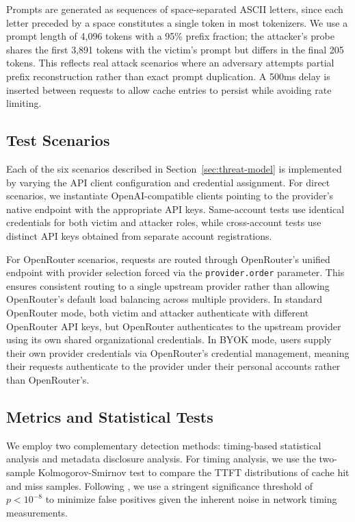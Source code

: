 \documentclass[conference]{IEEEtran}
\begin{document}
Prompts are generated as sequences of space-separated ASCII letters, since each letter preceded by a space constitutes a single token in most tokenizers.
We use a prompt length of 4,096 tokens with a 95\% prefix fraction; the attacker's probe shares the first 3,891 tokens with the victim's prompt but differs in the final 205 tokens.
This reflects real attack scenarios where an adversary attempts partial prefix reconstruction rather than exact prompt duplication.
A 500ms delay is inserted between requests to allow cache entries to persist while avoiding rate limiting.

\subsection{Test Scenarios}

Each of the six scenarios described in Section~\ref{sec:threat-model} is implemented by varying the API client configuration and credential assignment.
For direct scenarios, we instantiate OpenAI-compatible clients pointing to the provider's native endpoint with the appropriate API keys.
Same-account tests use identical credentials for both victim and attacker roles, while cross-account tests use distinct API keys obtained from separate account registrations.

For OpenRouter scenarios, requests are routed through OpenRouter's unified endpoint with provider selection forced via the \texttt{provider.order} parameter.
This ensures consistent routing to a single upstream provider rather than allowing OpenRouter's default load balancing across multiple providers.
In standard OpenRouter mode, both victim and attacker authenticate with different OpenRouter API keys, but OpenRouter authenticates to the upstream provider using its own shared organizational credentials.
In BYOK mode, users supply their own provider credentials via OpenRouter's credential management, meaning their requests authenticate to the provider under their personal accounts rather than OpenRouter's.

\subsection{Metrics and Statistical Tests}

We employ two complementary detection methods: timing-based statistical analysis and metadata disclosure analysis.
For timing analysis, we use the two-sample Kolmogorov-Smirnov test to compare the TTFT distributions of cache hit and miss samples.
Following \cite{DBLP:conf/icml/GuLKLH25}, we use a stringent significance threshold of $p < 10^{-8}$ to minimize false positives given the inherent noise in network timing measurements.
\end{document}
